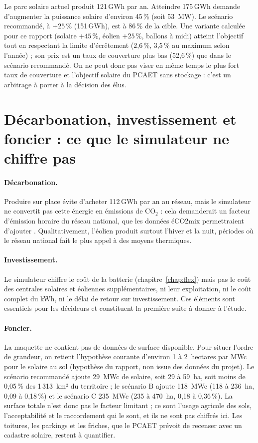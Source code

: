 \documentclass[11pt, a4paper]{report}
\newcommand{\pct}{\,\%}
\newcommand{\gwh}{\,GWh}
\begin{document}
Le parc solaire actuel produit 121\gwh{} par an. Atteindre 175\gwh{} demande d'augmenter la puissance solaire d'environ 45\pct{} (soit 53~MW). Le scénario recommandé, à $+25\pct$ (151\gwh), est à 86\pct{} de la cible. Une variante calculée pour ce rapport (solaire $+45\pct$, éolien $+25\pct$, ballons à midi) atteint l'objectif tout en respectant la limite d'écrêtement (2,6\pct, 3,5\pct{} au maximum selon l'année) ; son prix est un taux de couverture plus bas (52,6\pct) que dans le scénario recommandé. On ne peut donc pas viser en même temps le plus fort taux de couverture et l'objectif solaire du PCAET sans stockage : c'est un arbitrage à porter à la décision des élus.

\section{Décarbonation, investissement et foncier : ce que le simulateur ne chiffre pas}

\paragraph{Décarbonation.} Produire sur place évite d'acheter 112\gwh{} par an au réseau, mais le simulateur ne convertit pas cette énergie en émissions de CO$_2$ : cela demanderait un facteur d'émission horaire du réseau national, que les données éCO2mix permettraient d'ajouter \cite{rte_eco2mix}. Qualitativement, l'éolien produit surtout l'hiver et la nuit, périodes où le réseau national fait le plus appel à des moyens thermiques.

\paragraph{Investissement.} Le simulateur chiffre le coût de la batterie (chapitre~\ref{chap:flex}) mais pas le coût des centrales solaires et éoliennes supplémentaires, ni leur exploitation, ni le coût complet du kWh, ni le délai de retour sur investissement. Ces éléments sont essentiels pour les décideurs et constituent la première suite à donner à l'étude.

\paragraph{Foncier.} La maquette ne contient pas de données de surface disponible. Pour situer l'ordre de grandeur, on retient l'hypothèse courante d'environ 1 à 2~hectares par MWc pour le solaire au sol (hypothèse du rapport, non issue des données du projet). Le scénario recommandé ajoute 29~MWc de solaire, soit 29 à 59~ha, soit moins de 0,05\pct{} des 1\,313~km² du territoire ; le scénario B ajoute 118~MWc (118 à 236~ha, 0,09 à 0,18\pct) et le scénario C 235~MWc (235 à 470~ha, 0,18 à 0,36\pct). La surface totale n'est donc pas le facteur limitant ; ce sont l'usage agricole des sols, l'acceptabilité et le raccordement qui le sont, et ils ne sont pas chiffrés ici. Les toitures, les parkings et les friches, que le PCAET prévoit de recenser avec un cadastre solaire, restent à quantifier.
\end{document}
